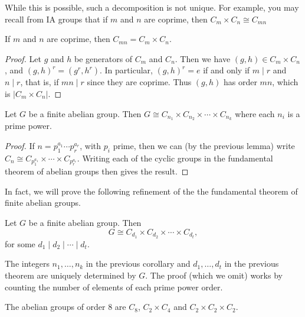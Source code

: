 \documentclass[a4paper]{scrreprt}
\begin{document}
\begin{remark}
	While this is possible, such a decomposition is not unique.
For example, you may recall from IA groups that if $m$ and $n$ are coprime, then $C_m \times C_n \cong C_{mn}$
\end{remark}

\begin{lemma}
	If $m$ and $n$ are coprime, then $C_{mn} = C_m \times C_n$.
\end{lemma}
\begin{proof}
	Let $g$ and $h$ be generators of $C_m$ and $C_n$. Then we have $(g, h) \in C_m \times C_n$, and $(g, h)^r = (g^r, h^r)$. In particular, $(g, h)^r = e$ if and only if $m \mid r$ and $n \mid r$, that is, if $mn \mid r$ since they are coprime. Thus $(g, h)$ has order $mn$, which is $|C_m \times C_n|$.
\end{proof}

\begin{corollary}
	Let $G$ be a finite abelian group.
	Then $G \cong C_{n_1} \times C_{n_2} \times \cdots \times C_{n_k}$ where each $n_i$ is a prime power.
\end{corollary}
\begin{proof}
	If $n = p_1^{a_1} \cdots p_r^{a_r}$, with $p_i$ prime, then we can (by the previous lemma) write $C_{n} \cong C_{p_1^{a_1}} \times \cdots \times C_{p_r^{a_r}}$. Writing each of the cyclic groups in the fundamental theorem of abelian groups then gives the result.
\end{proof}


In fact, we will prove the following refinement of the the fundamental theorem of finite abelian groups.

\begin{theorem}
	Let $G$ be a finite abelian group. Then
	$$
	G \cong C_{d_1} \times C_{d_2} \times \cdots \times C_{d_t},
	$$
	for some $d_1 \mid d_2 \mid \cdots \mid d_t$.
\end{theorem}

\begin{remark}
	The integers $n_1, \dots, n_k$ in the previous corollary and $d_1, \dots, d_t$ in the previous theorem are uniquely determined by $G$.
	The proof (which we omit) works by counting the number of elements of each prime power order.
\end{remark}

\begin{example}
	The abelian groups of order 8 are $C_8$, $C_2 \times C_4$ and $C_2 \times C_2 \times C_2$.
\end{example}
\end{document}
